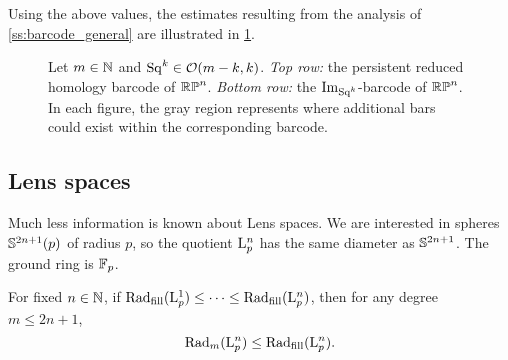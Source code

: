 Using the above values, the estimates resulting from the analysis of \cref{ss:barcode_general} are illustrated in \cref{fig:sq barcodes}.

\begin{figure}
	\centering
	
	\caption{Let $m \in \mathbb{N}$ and $\mathrm{Sq}^k \in \mathcal{O}(m-k, k)$.
        \emph{Top row:} the persistent reduced homology barcode of $\mathbb{RP}^n$.
		\emph{Bottom row:} the $\operatorname{Im}_{\mathrm{Sq}^k}$-barcode of $\mathbb{RP}^n$.
        In each figure, the gray region represents where additional bars could exist within the corresponding barcode.
	}
	\label{fig:sq barcodes}
\end{figure}

\subsection{Lens spaces}\label{s:critical_radii_lens}

Much less information is known about Lens spaces.
We are interested in spheres \(\mathbb{S}^{2n+1}(p)\) of radius \(p\), so the quotient \(\mathrm{L}_p^n\) has the same diameter as \(\mathbb{S}^{2n+1}\).
The ground ring is \({\mathbb{F}_p}\).

\medskip\lemma
For fixed $n\in \mathbb{N}$, if $\mathrm{Rad}_{\mathrm{fill}}(\mathrm{L}^1_p) \leq \dotsb \leq \mathrm{Rad}_{\mathrm{fill}}(\mathrm{L}^n_p)$, then for any degree $m\leq 2n+1$,
\[
\mathrm{Rad}_{m}(\mathrm{L}^n_p) \leq \mathrm{Rad}_{\mathrm{fill}}(\mathrm{L}^n_p).
\]

